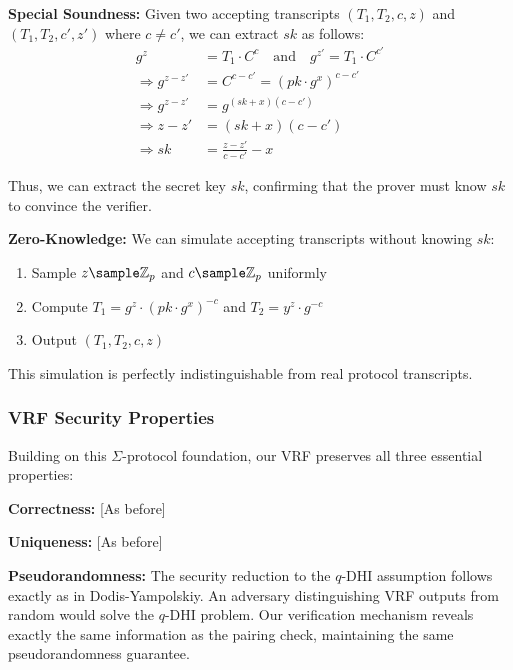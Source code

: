 \textbf{Special Soundness:} Given two accepting transcripts $(T_1, T_2, c, z)$ and $(T_1, T_2, c', z')$ where $c \neq c'$, we can extract $sk$ as follows:
\begin{align}
g^z &= T_1 \cdot C^c \quad \text{and} \quad g^{z'} = T_1 \cdot C^{c'}\\
\Rightarrow g^{z-z'} &= C^{c-c'} = (pk \cdot g^x)^{c-c'}\\
\Rightarrow g^{z-z'} &= g^{(sk+x)(c-c')}\\
\Rightarrow z-z' &= (sk+x)(c-c')\\
\Rightarrow sk &= \frac{z-z'}{c-c'} - x
\end{align}

Thus, we can extract the secret key $sk$, confirming that the prover must know $sk$ to convince the verifier.

\textbf{Zero-Knowledge:} We can simulate accepting transcripts without knowing $sk$:
\begin{enumerate}
    \item Sample $z \sample \mathbb{Z}_p$ and $c \sample \mathbb{Z}_p$ uniformly
    \item Compute $T_1 = g^z \cdot (pk \cdot g^x)^{-c}$ and $T_2 = y^z \cdot g^{-c}$
    \item Output $(T_1, T_2, c, z)$
\end{enumerate}
This simulation is perfectly indistinguishable from real protocol transcripts.

\subsubsection{VRF Security Properties}
Building on this $\Sigma$-protocol foundation, our VRF preserves all three essential properties:

\textbf{Correctness:} [As before]

\textbf{Uniqueness:} [As before]

\textbf{Pseudorandomness:} The security reduction to the $q$-DHI assumption follows exactly as in Dodis-Yampolskiy. An adversary distinguishing VRF outputs from random would solve the $q$-DHI problem. Our verification mechanism reveals exactly the same information as the pairing check, maintaining the same pseudorandomness guarantee.

















